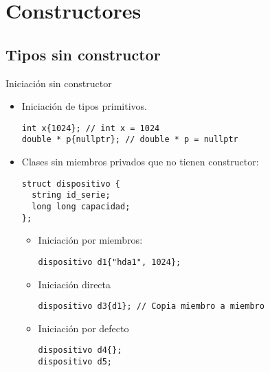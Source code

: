 \section{Constructores}

\subsection{Tipos sin constructor}

\begin{frame}[t,fragile]{Iniciación sin constructor}
\begin{itemize}
  \item Iniciación de tipos primitivos.
\begin{lstlisting}
int x{1024}; // int x = 1024
double * p{nullptr}; // double * p = nullptr
\end{lstlisting}

  \item Clases sin miembros privados que no tienen constructor:
\begin{lstlisting}
struct dispositivo {
  string id_serie;
  long long capacidad;
};
\end{lstlisting}

    \begin{itemize}
      \item Iniciación por miembros:
\begin{lstlisting}
dispositivo d1{"hda1", 1024};
\end{lstlisting}

      \item Iniciación directa
\begin{lstlisting}
dispositivo d3{d1}; // Copia miembro a miembro
\end{lstlisting}

      \item Iniciación por defecto
\begin{lstlisting}
dispositivo d4{};
dispositivo d5;
\end{lstlisting}
    \end{itemize}
\end{itemize}
\end{frame}

